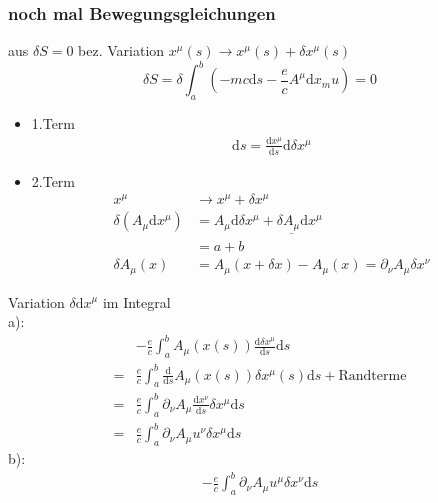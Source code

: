 \documentclass[a4paper]{article}
\begin{document}
\subsubsection{noch mal Bewegungsgleichungen}
aus $\delta S=0$ bez. Variation $x^\mu(s)\rightarrow x^\mu(s)+\delta x^\mu(s)$
\begin{equation}
\delta S=\delta \int^b_a(-mc\mathrm{d}s-\frac{e}{c}A^\mu \mathrm{d} x_mu)=0
\end{equation}
\begin{itemize}
  \item{1.Term} \begin{align}\mathrm{d}s=\frac{\mathrm{d} x^\mu}{\mathrm{d}
  s}\mathrm{d} \delta x^\mu
  \end{align}
  \item{2.Term} \begin{align}x^\mu&\rightarrow x^\mu+\delta x^\mu\\
  \delta(A_\mu \mathrm{d}\!x^\mu)&=A_\mu \mathrm{d}\delta\!x^\mu+\delta
  \underline{A_\mu} \mathrm{d}x^\mu\\&=a+b\\
  \delta A_\mu(x)&=A_\mu(x+\delta x)-A_\mu(x)=\partial_\nu A_\mu \delta x^\nu
  \end{align}
\end{itemize}
Variation $\delta \mathrm{d}x^\mu$ im Integral\\ 
a):
\begin{align}
&-\frac{e}{c}\int^b_a A_\mu(x(s))\frac{\mathrm{d}\delta x^\mu}{\mathrm{d}s}\mathrm{d}s\\
=&\frac{e}{c}\int^b_a \frac{\mathrm{d}}{\mathrm{d}s}A_\mu(x(s))\delta x^\mu(s) \mathrm{d}s +
\text{Randterme}\\
=&\frac{e}{c}\int^b_a \partial_\nu A_\mu \frac{\mathrm{d}x^\nu}{\mathrm{d}s}\delta x^\mu \mathrm{d}s\\
=&\frac{e}{c}\int^b_a \partial_\nu A_\mu u^\nu\delta x^\mu \mathrm{d}s
\end{align}
b):
\begin{align}
-\frac{e}{c}\int^b_a \partial_\nu A_\mu u^\mu\delta x^\nu \mathrm{d}s
\end{align}
\end{document}
